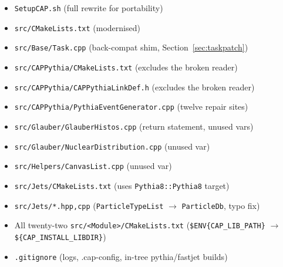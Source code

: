 \documentclass[11pt,a4paper]{article}
\begin{document}
\begin{itemize}[leftmargin=2em,itemsep=0pt]
  \item \texttt{SetupCAP.sh} (full rewrite for portability)
  \item \texttt{src/CMakeLists.txt} (modernised)
  \item \texttt{src/Base/Task.cpp} (back-compat shim, Section~\ref{sec:taskpatch})
  \item \texttt{src/CAPPythia/CMakeLists.txt} (excludes the broken reader)
  \item \texttt{src/CAPPythia/CAPPythiaLinkDef.h} (excludes the broken reader)
  \item \texttt{src/CAPPythia/PythiaEventGenerator.cpp} (twelve repair sites)
  \item \texttt{src/Glauber/GlauberHistos.cpp} (return statement, unused vars)
  \item \texttt{src/Glauber/NuclearDistribution.cpp} (unused var)
  \item \texttt{src/Helpers/CanvasList.cpp} (unused var)
  \item \texttt{src/Jets/CMakeLists.txt} (uses \texttt{Pythia8::Pythia8} target)
  \item \texttt{src/Jets/*.{hpp,cpp}}
        (\texttt{ParticleTypeList} $\to$ \texttt{ParticleDb}, typo fix)
  \item All twenty-two \texttt{src/<Module>/CMakeLists.txt}
        (\texttt{\$ENV\{CAP\_LIB\_PATH\}} $\to$ \texttt{\$\{CAP\_INSTALL\_LIBDIR\}})
  \item \texttt{.gitignore} (logs, .cap-config, in-tree pythia/fastjet builds)
\end{itemize}
\end{document}
